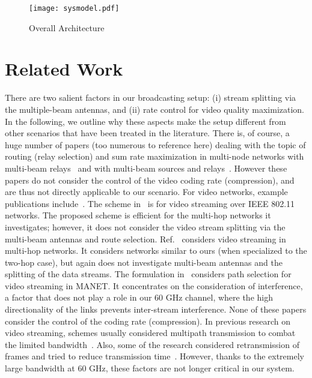 \documentclass[conference]{IEEEtran}
\begin{document}
\begin{figure}[t!]
	\begin{center}
		\texttt{[image: sysmodel.pdf]}
	\end{center}
	\caption{Overall Architecture}
	\label{fig:sysmodel}
\end{figure}	

\section{Related Work}\label{sec:related}

There are two salient factors in our broadcasting setup: (i) stream splitting via the multiple-beam antennas, and (ii) rate control for video quality maximization. In the following, we outline why these aspects make the setup different from other scenarios that have been treated in the literature.
There is, of course, a huge number of papers (too numerous to reference here) dealing with the topic of routing (relay selection) and sum rate maximization in multi-node networks with multi-beam relays~\cite{yilmaz10icc} and with multi-beam sources and relays~\cite{liu12jsac}. However these papers do not consider the control of the video coding rate (compression), and are thus not directly applicable to our scenario.
For video networks, example publications include~\cite{videorelay1, videorelay2, videorelay3}. The scheme in~\cite{videorelay1} is for video streaming over IEEE 802.11 networks. The proposed scheme is efficient for the multi-hop networks it investigates; however, it does not consider the video stream splitting via the multi-beam antennas and route selection.
Ref.~\cite{videorelay2} considers video streaming in multi-hop networks. It considers networks similar to ours (when specialized to the two-hop case), but again does not investigate multi-beam antennas and the splitting of the data streams. The formulation in~\cite{videorelay3} considers path selection for video streaming in MANET. It concentrates on the consideration of interference, a factor that does not play a role in our 60 GHz channel, where the high directionality of the links prevents inter-stream interference. None of these papers consider the control of the coding rate (compression).
In previous research on video streaming, schemes usually considered multipath transmission to combat the limited bandwidth~\cite{videorelay2}\cite{videorelay3}. Also, some of the research considered retransmission of frames and tried to reduce transmission time~\cite{videorelay1}. However, thanks to the extremely large bandwidth at 60 GHz, these factors are not longer critical in our system.
\end{document}
